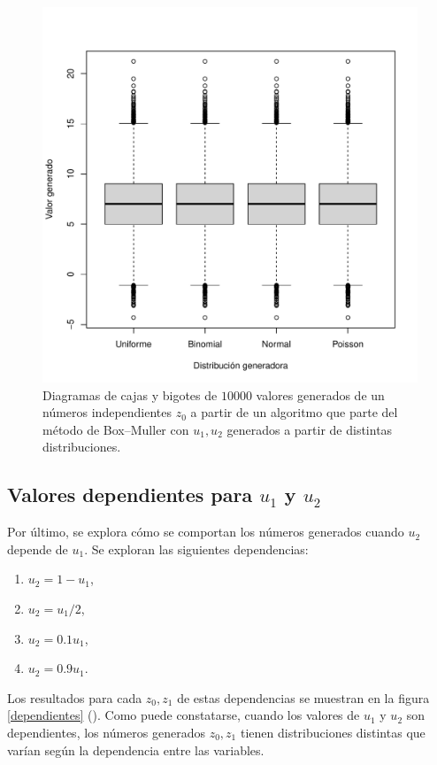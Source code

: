 \documentclass[paper=leter, fontsize=11pt]{scrartcl}
\numberwithin{equation}{section}		%
\numberwithin{figure}{section}			%
\numberwithin{table}{section}				%
\begin{document}
\begin{figure}
    \centering
    \includegraphics[width=1\textwidth]{distribuciones.pdf}
    \caption{Diagramas de cajas y bigotes de $10000$ valores generados de un números independientes $z_0$ a partir de un algoritmo que parte del método de Box--Muller con $u_1, u_2$ generados a partir de distintas distribuciones.}
    \label{distribuciones}
\end{figure}

\subsection{Valores dependientes para $u_1$ y $u_2$}
Por último, se explora cómo se comportan los números generados cuando $u_2$ depende de $u_1$. Se exploran las siguientes dependencias:
\begin{enumerate}
    \item $u_2 = 1 - u_1$,
    \item $u_2 = u_1 / 2$,
    \item $u_2 = 0.1 u_1$,
    \item $u_2 = 0.9 u_1$.
\end{enumerate}

Los resultados para cada $z_0, z_1$ de estas dependencias se muestran en la figura \ref{dependientes} (\pageref{dependientes}). Como puede constatarse, cuando los valores de $u_1$ y $u_2$ son dependientes, los números generados $z_0, z_1$ tienen distribuciones distintas que varían según la dependencia entre las variables.
\end{document}
